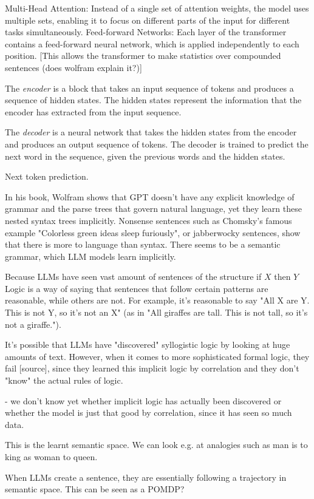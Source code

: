 Multi-Head Attention: Instead of a single set of attention weights, the model uses multiple sets, enabling it to focus on different parts of the input for different tasks simultaneously.
Feed-forward Networks: Each layer of the transformer contains a feed-forward neural network, which is applied independently to each position. [This allows the transformer to make statistics over compounded sentences (does wolfram explain it?)]

The \emph{encoder} is a block that takes an input sequence of tokens and produces a sequence of hidden states. The hidden states represent the information that the encoder has extracted from the input sequence.

The \emph{decoder} is a neural network that takes the hidden states from the encoder and produces an output sequence of tokens. The decoder is trained to predict the next word in the sequence, given the previous words and the hidden states.

Next token prediction.

In his book, Wolfram shows that GPT doesn't have any explicit knowledge of grammar and the parse trees that govern natural language, yet they learn these nested syntax trees implicitly. 
Nonsense sentences such as Chomsky's famous example "Colorless green ideas sleep furiously", or jabberwocky sentences, show that there is more to language than syntax. There seems to be a semantic grammar, which LLM models learn implicitly.

Because LLMs have seen vast amount of sentences of the structure if $X$ then $Y$
Logic is a way of saying that sentences that follow certain patterns are reasonable, while others are not. For example, it's reasonable to say "All X are Y. This is not Y, so it's not an X" (as in "All giraffes are tall. This is not tall, so it's not a giraffe.").

It's possible that LLMs have "discovered" syllogistic logic by looking at huge amounts of text. However, when it comes to more sophisticated formal logic, they fail [source], since they learned this implicit logic by correlation and they don't "know" the actual rules of logic.

- we don't know yet whether implicit logic has actually been discovered or whether the model is just that good by correlation, since it has seen so much data.


This is the learnt semantic space. We can look e.g. at analogies such as man is to king as woman to queen.

When LLMs create a sentence, they are essentially following a trajectory in semantic space. This can be seen as a POMDP?


